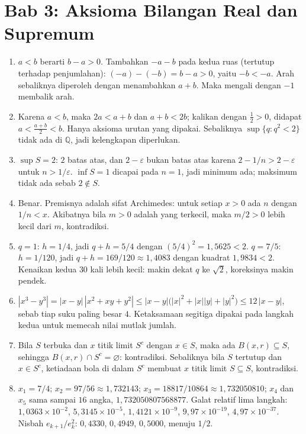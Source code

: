 \section*{Bab 3: Aksioma Bilangan Real dan Supremum}
\begin{enumerate}[label=\textbf{3.\arabic*}]
  \item $a<b$ berarti $b-a>0$. Tambahkan $-a-b$ pada kedua ruas (tertutup terhadap
        penjumlahan): $(-a)-(-b)=b-a>0$, yaitu $-b<-a$. Arah sebaliknya diperoleh
        dengan menambahkan $a+b$. Maka mengali dengan $-1$ membalik arah.

  \item Karena $a<b$, maka $2a<a+b$ dan $a+b<2b$; kalikan dengan $\tfrac12>0$,
        didapat $a<\frac{a+b}{2}<b$. Hanya aksioma urutan yang dipakai. Sebaliknya
        $\sup\{q:q^{2}<2\}$ tidak ada di $\mathbb{Q}$, jadi kelengkapan diperlukan.

  \item $\sup S=2$: $2$ batas atas, dan $2-\varepsilon$ bukan batas atas karena
        $2-1/n>2-\varepsilon$ untuk $n>1/\varepsilon$. $\inf S=1$ dicapai pada
        $n=1$, jadi minimum ada; maksimum tidak ada sebab $2\notin S$.

  \item Benar. Premisnya adalah sifat Archimedes: untuk setiap $x>0$ ada $n$ dengan
        $1/n<x$. Akibatnya bila $m>0$ adalah yang terkecil, maka $m/2>0$ lebih kecil
        dari $m$, kontradiksi.

  \item $q=1$: $h=1/4$, jadi $q+h=5/4$ dengan $(5/4)^{2}=1{,}5625<2$. $q=7/5$:
        $h=1/120$, jadi $q+h=169/120\approx 1{,}4083$ dengan kuadrat
        $1{,}9834<2$. Kenaikan kedua $30$ kali lebih kecil: makin dekat $q$ ke
        $\sqrt2$, koreksinya makin pendek.

  \item $|x^{3}-y^{3}|=|x-y|\,|x^{2}+xy+y^{2}|\le|x-y|\bigl(|x|^{2}+|x||y|+|y|^{2}\bigr)
        \le 12\,|x-y|$, sebab tiap suku paling besar $4$. Ketaksamaan segitiga
        dipakai pada langkah kedua untuk memecah nilai mutlak jumlah.

  \item Bila $S$ terbuka dan $x$ titik limit $S^{c}$ dengan $x\in S$, maka ada
        $B(x,r)\subseteq S$, sehingga $B(x,r)\cap S^{c}=\varnothing$: kontradiksi.
        Sebaliknya bila $S$ tertutup dan $x\in S^{c}$, ketiadaan bola di dalam
        $S^{c}$ membuat $x$ titik limit $S\subseteq S$, kontradiksi.

  \item $x_{1}=7/4$; $x_{2}=97/56\approx 1{,}732143$;
        $x_{3}=18817/10864\approx 1{,}732050810$; $x_{4}$ dan $x_{5}$ sama sampai
        $16$ angka, $1{,}732050807568877$. Galat relatif
        lima langkah: $1{,}0363\times10^{-2}$, $5{,}3145\times10^{-5}$,
        $1{,}4121\times10^{-9}$, $9{,}97\times10^{-19}$, $4{,}97\times10^{-37}$.
        Nisbah $e_{k+1}/e_{k}^{2}$: $0{,}4330$, $0{,}4949$, $0{,}5000$, menuju $1/2$.


\end{enumerate}
